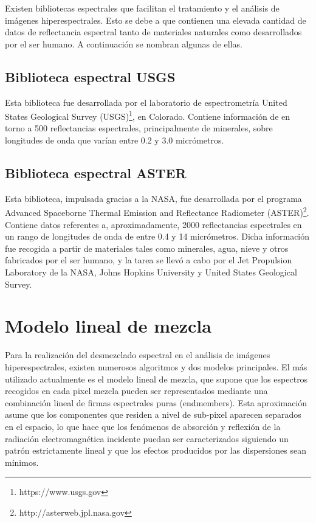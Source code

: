 Existen bibliotecas espectrales que facilitan el tratamiento y el análisis de imágenes hiperespectrales. Esto se debe a que contienen una elevada cantidad de datos de reflectancia espectral tanto de materiales naturales como desarrollados por el ser humano. A continuación se nombran algunas de ellas.

\subsection{Biblioteca espectral USGS}

Esta biblioteca fue desarrollada por el laboratorio de espectrometría United States Geological Survey (USGS)\footnote{https://www.usgs.gov}, en Colorado. Contiene información de en torno a 500 reflectancias espectrales, principalmente de minerales, sobre longitudes de onda que varían entre 0.2 y 3.0 micrómetros.

\subsection{Biblioteca espectral ASTER}

Esta biblioteca, impulsada gracias a la NASA, fue desarrollada por el programa Advanced Spaceborne Thermal Emission and Reflectance Radiometer (ASTER)\footnote{http://asterweb.jpl.nasa.gov}. Contiene datos referentes a, aproximadamente, 2000 reflectancias espectrales en un rango de longitudes de onda de entre 0.4 y 14 micrómetros. Dicha información fue recogida a partir de materiales tales como minerales, agua, nieve y otros fabricados por el ser humano, y la tarea se llevó a cabo por el Jet Propulsion Laboratory de la NASA, Johns Hopkins University y United States Geological Survey.

\section{Modelo lineal de mezcla}

Para la realización del desmezclado espectral \cite{biblio:Spectral_unmixing} en el análisis de imágenes hiperespectrales, existen numerosos algoritmos \cite{biblio:varios_alg_desmezclado} y dos modelos principales. El más utilizado actualmente es el modelo lineal de mezcla, que supone que los espectros recogidos en cada pixel mezcla pueden ser representados mediante una combinación lineal de firmas espectrales puras (endmembers). Esta aproximación asume que los componentes que residen a nivel de sub-pixel aparecen separados en el espacio, lo que hace que los fenómenos de absorción y reflexión de la radiación electromagnética incidente puedan ser caracterizados siguiendo un patrón estrictamente lineal y que los efectos producidos por las dispersiones sean mínimos.


